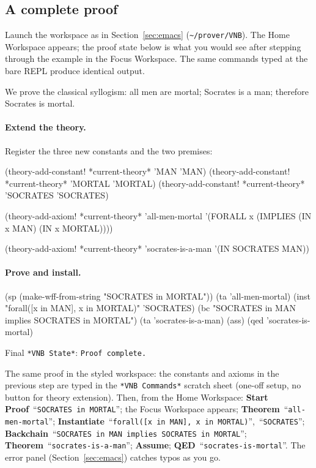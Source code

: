 \subsection{A complete proof}
\label{sec:quickstart}

\begin{sloppypar}
Launch the workspace as in Section~\ref{sec:emacs} (\texttt{\textasciitilde/prover/VNB}).
The Home Workspace appears; the proof state below is what you would
see after stepping through the example in the Focus Workspace.  The
same commands typed at the bare REPL produce identical output.
\end{sloppypar}

We prove the classical syllogism: all men are mortal; Socrates is a
man; therefore Socrates is mortal.

\paragraph{Extend the theory.}
Register the three new constants and the two premises:

\begin{VNBsnip}
(theory-add-constant! *current-theory* 'MAN      'MAN)
(theory-add-constant! *current-theory* 'MORTAL   'MORTAL)
(theory-add-constant! *current-theory* 'SOCRATES 'SOCRATES)

(theory-add-axiom! *current-theory* 'all-men-mortal
  '(FORALL x (IMPLIES (IN x MAN) (IN x MORTAL))))

(theory-add-axiom! *current-theory* 'socrates-is-a-man
  '(IN SOCRATES MAN))
\end{VNBsnip}

\paragraph{Prove and install.}

\begin{VNBsnip}
(sp   (make-wff-from-string "SOCRATES in MORTAL"))
(ta   'all-men-mortal)
(inst "forall([x in MAN], x in MORTAL)" 'SOCRATES)
(bc   "SOCRATES in MAN implies SOCRATES in MORTAL")
(ta   'socrates-is-a-man)
(ass)
(qed  'socrates-is-mortal)
\end{VNBsnip}

Final \texttt{*VNB State*}: \texttt{Proof complete.}

\begin{remark}
The same proof in the styled workspace: the constants and axioms in
the previous step are typed in the \texttt{*VNB Commands*} scratch
sheet (one-off setup, no button for theory extension).  Then, from
the Home Workspace: \textbf{Start Proof}~``\texttt{SOCRATES in MORTAL}'';
the Focus Workspace appears; \textbf{Theorem}~``\texttt{all-men-mortal}'';
\textbf{Instantiate}~``\texttt{forall([x in MAN], x in MORTAL)}'',~``\texttt{SOCRATES}'';
\textbf{Backchain}~``\texttt{SOCRATES in MAN implies SOCRATES in MORTAL}'';
\textbf{Theorem}~``\texttt{socrates-is-a-man}'';
\textbf{Assume};
\textbf{QED}~``\texttt{socrates-is-mortal}''.  The error panel
(Section~\ref{sec:emacs}) catches typos as you go.
\end{remark}

